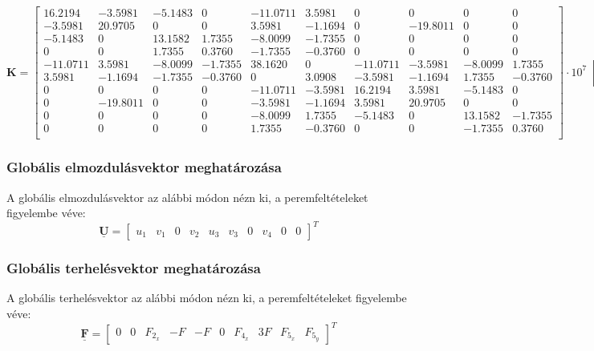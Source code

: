 \documentclass[12pt,a4paper]{article}
\def\mx#1{\mathbf{#1}}
\def\vec#1{\underline{\mathbf{#1}}}
\def\Nm{\; \left[\mathrm{\frac{N}{m}}\right]}
\def\futyi{\cdot 10^{7}}
\begin{document}
{\tiny
\begin{equation}
    \mx{K}=
    \begin{bmatrix}
        16.2194  & -3.5981  & -5.1483 & 0       & -11.0711 & 3.5981  & 0        & 0        & 0       & 0       \\
        -3.5981  & 20.9705  & 0       & 0       & 3.5981   & -1.1694 & 0        & -19.8011 & 0       & 0       \\
        -5.1483  & 0        & 13.1582 & 1.7355  & -8.0099  & -1.7355 & 0        & 0        & 0       & 0       \\
        0        & 0        & 1.7355  & 0.3760  & -1.7355  & -0.3760 & 0        & 0        & 0       & 0       \\
        -11.0711 & 3.5981   & -8.0099 & -1.7355 & 38.1620  & 0       & -11.0711 & -3.5981  & -8.0099 & 1.7355  \\
        3.5981   & -1.1694  & -1.7355 & -0.3760 & 0        & 3.0908  & -3.5981  & -1.1694  & 1.7355  & -0.3760 \\
        0        & 0        & 0       & 0       & -11.0711 & -3.5981 & 16.2194  & 3.5981   & -5.1483 & 0       \\
        0        & -19.8011 & 0       & 0       & -3.5981  & -1.1694 & 3.5981   & 20.9705  & 0       & 0       \\
        0        & 0        & 0       & 0       & -8.0099  & 1.7355  & -5.1483  & 0        & 13.1582 & -1.7355 \\
        0        & 0        & 0       & 0       & 1.7355   & -0.3760 & 0        & 0        & -1.7355 & 0.3760  \\
    \end{bmatrix} \futyi \Nm
\end{equation}}
\subsubsection{Globális elmozdulásvektor meghatározása}
A globális elmozdulásvektor az alábbi módon nézn ki, a peremfeltételeket
figyelembe véve:
\noindent
\begin{equation}
    \vec{\mathbf{U}}=
    \begin{bmatrix}
        u_1 &
        v_1 &
        0   &
        v_2 &
        u_3 &
        v_3 &
        0   &
        v_4 &
        0   &
        0
    \end{bmatrix}^{T}
\end{equation}
\subsubsection{Globális terhelésvektor meghatározása}
A globális terhelésvektor az alábbi módon nézn ki, a peremfeltételeket
figyelembe véve:
\begin{equation}
    \vec{\mathbf{F}}=
    \begin{bmatrix}
        0       &
        0       &
        F_{2_x} &
        -F      &
        -F      &
        0       &
        F_{4_x} &
        3 F     &
        F_{5_x} &
        F_{5_y}
    \end{bmatrix}^{T}
\end{equation}
\end{document}
